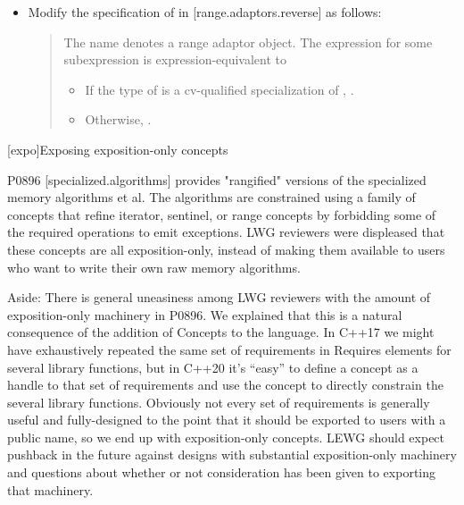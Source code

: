 \begin{itemize}
\item Modify the specification of  in
  [range.adaptors.reverse] as follows:
  \begin{quote}
\pnum
The name  denotes a
range adaptor object. The expression
 for some subexpression  is
expression-equivalent to\added{:} 
\begin{addedblock}
\begin{itemize}
\item If the type of  is a cv-qualified specialization of
  , .
\item Otherwise, .
\end{itemize}
\end{addedblock}
  \end{quote}
\end{itemize}


[expo]{Exposing exposition-only concepts}

P0896 [specialized.algorithms] provides "rangified" versions of the specialized
memory algorithms  et al. The algorithms are
constrained using a family of concepts that refine iterator, sentinel, or range
concepts by forbidding some of the required operations to emit exceptions. LWG
reviewers were displeased that these concepts are all exposition-only, instead
of making them available to users who want to write their own raw memory
algorithms.

Aside: There is general uneasiness among LWG reviewers with the amount of
exposition-only machinery in P0896. We explained that this is a natural
consequence of the addition of Concepts to the language. In C++17 we might
have exhaustively repeated the same set of requirements in Requires elements for
several library functions, but in C++20 it's ``easy'' to define a concept as a
handle to that set of requirements and use the concept to directly constrain the
several library functions. Obviously not every set of requirements is generally
useful and fully-designed to the point that it should be exported to users with
a public name, so we end up with exposition-only concepts. LEWG should expect
pushback in the future against designs with substantial exposition-only
machinery and questions about whether or not consideration has been given to
exporting that machinery.

